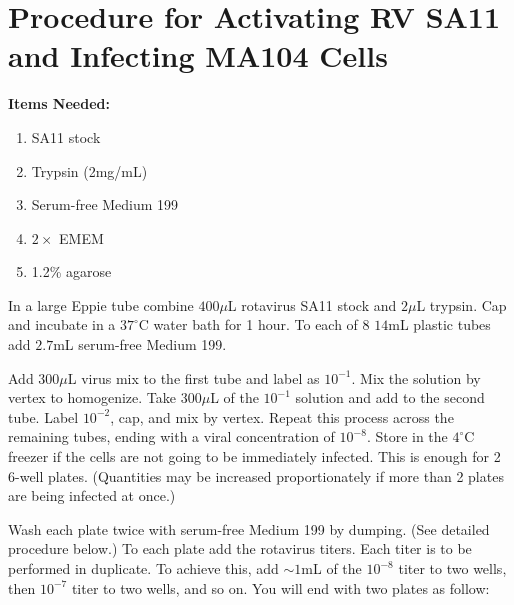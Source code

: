 \section{Procedure for Activating RV SA11 and Infecting MA104 Cells}

{\bfseries Items Needed:} \begin{enumerate}
	\item SA11 stock
	\item Trypsin (2mg/mL)
	\item Serum-free Medium 199
	\item $2\times$ EMEM
	\item 1.2\% agarose
\end{enumerate}

In a large Eppie tube combine $400\mu$L rotavirus SA11 stock and $2\mu$L trypsin. Cap and incubate in a $37^{\circ}$C water bath for 1 hour. To each of 8 $14$mL plastic tubes add $2.7$mL serum-free Medium 199.

Add $300\mu$L virus mix to the first tube and label as $10^{-1}$. Mix the solution by vertex to homogenize. Take $300\mu$L of the $10^{-1}$ solution and add to the second tube. Label $10^{-2}$, cap, and mix by vertex. Repeat this process across the remaining tubes, ending with a viral concentration of $10^{-8}$. Store in the $4^{\circ}$C freezer if the cells are not going to be immediately infected. This is enough for 2 6-well plates. (Quantities may be increased proportionately if more than 2 plates are being infected at once.)

Wash each plate twice with serum-free Medium 199 by dumping. (See detailed procedure below.) To each plate add the rotavirus titers. Each titer is to be performed in duplicate. To achieve this, add $\sim 1$mL of the $10^{-8}$ titer to two wells, then $10^{-7}$ titer to two wells, and so on. You will end with two plates as follow:

